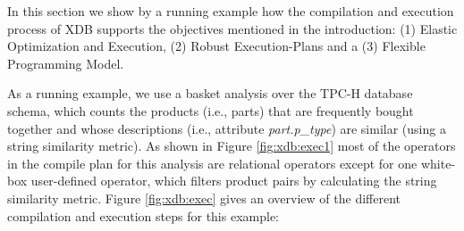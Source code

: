 \documentclass{sig-alternate}
\begin{document}
In this section we show by a running example how the compilation and execution process of XDB supports the objectives mentioned in the introduction: (1) Elastic Optimization and Execution, (2) Robust Execution-Plans and a (3) Flexible Programming Model.

As a running example, we use a basket analysis over the TPC-H database schema, which counts the products (i.e., parts) that are frequently bought together and whose descriptions (i.e., attribute \emph{part.p\_type}) are similar (using a string similarity metric).  As shown in Figure \ref{fig:xdb:exec1} most of the operators in the compile plan for this analysis are relational operators except for one white-box user-defined operator, which filters product pairs by calculating the string similarity metric. 
Figure \ref{fig:xdb:exec} gives an overview of the different compilation and execution steps for this example:
\end{document}
